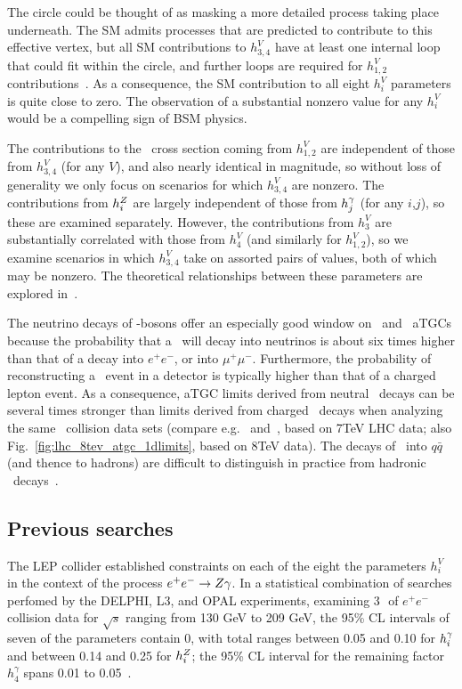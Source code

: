 The circle could be thought of as masking a more detailed process taking place underneath. The SM admits processes that are predicted to contribute
to this effective vertex, but all SM contributions to $h_{3,4}^{V}$ have at least one internal loop that could fit within the circle, and
further loops are required for $h_{1,2}^{V}$ contributions~\cite{ref:PhysRevD.47.4889}.
As a consequence, the SM contribution to all eight $h_{i}^{V}$ parameters is quite close to zero.
The observation of a substantial nonzero value for any $h_{i}^{V}$ would be a compelling sign of BSM physics.

The contributions to the \zinvg\ cross section coming from $h_{1,2}^{V}$ are independent of those from $h_{3,4}^{V}$ (for any $V$), and also nearly identical
in magnitude, so without loss of generality we only focus on scenarios for which $h_{3,4}^{V}$ are nonzero. The contributions
from $h_{i}^{Z}$ are largely independent of those from $h_{j}^{\gamma}$ (for any $i$,$j$), so these are examined separately.
However, the contributions from $h_{3}^{V}$ are substantially correlated with those from $h_{4}^{V}$ (and similarly for $h_{1,2}^{V}$), so we examine
scenarios in which $h_{3,4}^{V}$ take on assorted pairs of values, both of which may be nonzero. The theoretical relationships between these parameters
are explored in~\cite{ref:PhysRevD.47.4889}.

The neutrino decays of \PZ-bosons offer an especially good window on \PZ\PZ\Pgamma\ and \PZ\Pgamma\Pgamma\ aTGCs because the
probability that a \PZ\ will decay into neutrinos is about six times higher than that of a decay into $e^\mathrm{+}e^\mathrm{-}$, or into $\mu^\mathrm{+}\mu^\mathrm{-}$.
Furthermore, the probability of reconstructing a \zinvg\ event in a detector is typically
higher than that of a charged lepton event. As a consequence, aTGC limits derived from neutral \PZ\ decays can be several times
stronger than limits derived from charged \PZ\ decays when analyzing the same \Pp\Pp\ collision data sets (compare e.g.~\cite{ref:PhysRevD.89.092005} and~\cite{ref:JHEP10(2013)164},
based on 7\unit{TeV} LHC data; also Fig.~\ref{fig:lhc_8tev_atgc_1dlimits}, based on 8\unit{TeV} data).
The decays of \PZ\ into $q\bar{q}$ (and thence to hadrons) are difficult to distinguish in practice from hadronic \PW\ decays~\cite{ref:RevModPhys.89.035008}.

\subsection{Previous searches} \label{sec:introduction_aTGC_previous_searches}
The LEP collider established constraints on each of the eight the parameters $h_{i}^{V}$ in the context of the process $e^{\mathrm{+}}e^{\mathrm{-}} \to Z\gamma$.
In a statistical combination of searches perfomed by the DELPHI, L3, and OPAL experiments, examining 3\,\fbinv\ of $e^{\mathrm{+}}e^{\mathrm{-}}$ collision data
for $\sqrt{s}$ ranging from 130 GeV to 209 GeV, the 95\% CL intervals of seven of the parameters contain 0, with total ranges between 0.05 and 0.10 for $h_{i}^{\gamma}$
and between 0.14 and 0.25 for $h_{i}^{Z}$; the 95\% CL interval for the remaining factor $h_{4}^{\gamma}$ spans 0.01 to 0.05~\cite{ref:j.physrep.2013.07.004}.

